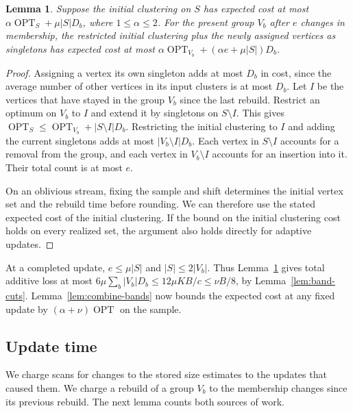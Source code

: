 \documentclass[11pt]{article}
\newtheorem{lemma}[theorem]{Lemma}
\newcommand{\OPT}{\operatorname{OPT}}
\begin{document}
\begin{lemma}\label{lem:dynamic-band}
Suppose the initial clustering on $S$ has expected cost at most
$\alpha\OPT_S+\mu|S|D_b$, where $1\le\alpha\le2$. For the present
group $V_b$ after $e$ changes in membership, the restricted initial clustering plus
the newly assigned vertices as singletons has expected cost at most
$\alpha\OPT_{V_b}+(\alpha e+\mu|S|)D_b$.
\end{lemma}
\begin{proof}
Assigning a vertex its own singleton adds at most $D_b$ in cost,
since the average number of other vertices in its input clusters is
at most $D_b$. Let $I$ be the vertices that have stayed in the group $V_b$
since the last rebuild. Restrict an optimum on $V_b$ to $I$ and extend
it by singletons on $S\setminus I$. This gives
$\OPT_S\le\OPT_{V_b}+|S\setminus I|D_b$. Restricting the initial clustering to $I$
and adding the current singletons adds at most $|V_b\setminus I|D_b$.
Each vertex in $S\setminus I$ accounts for a removal from the group,
and each vertex in $V_b\setminus I$ accounts for an insertion into it. Their total count is at most $e$.

On an oblivious stream, fixing the sample and shift determines the
initial vertex set and the rebuild time before rounding. We can therefore use
the stated expected cost of the initial clustering. If the bound on the initial clustering cost holds on every
realized set, the argument also holds directly for adaptive updates.
\end{proof}

At a completed update, $e\le\mu|S|$ and $|S|\le2|V_b|$. Thus
Lemma~\ref{lem:dynamic-band} gives total additive loss at most
$6\mu\sum_b|V_b|D_b\le12\mu KB/c\le\nu B/8$, by
Lemma~\ref{lem:band-cuts}. Lemma~\ref{lem:combine-bands} now bounds the expected cost at any
fixed update by $(\alpha+\nu)\OPT$ on the sample.

\subsection{Update time}

We charge scans for changes to the stored size estimates to the updates that
caused them. We charge a rebuild of a group $V_b$ to the membership changes
since its previous rebuild. The next lemma counts both sources of
work.
\end{document}
